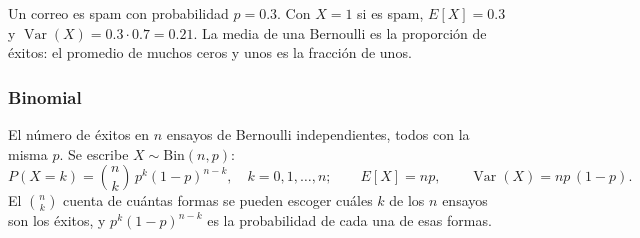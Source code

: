 \documentclass[11pt,letterpaper]{article}
\begin{document}
\begin{ejemplo}[¿Es spam?]
    Un correo es spam con probabilidad $p = 0.3$. Con $X = 1$ si es
    spam, $E[X] = 0.3$ y $\operatorname{Var}(X) = 0.3 \cdot 0.7 =
    0.21$. La media de una Bernoulli es la proporción de éxitos: el
    promedio de muchos ceros y unos es la fracción de unos.
    \begin{center}
    \end{center}
\end{ejemplo}

\subsubsection*{Binomial}

El número de éxitos en $n$ ensayos de Bernoulli independientes, todos
con la misma $p$. Se escribe $X \sim \text{Bin}(n, p)$:
\[
    P(X = k) = \binom{n}{k}\, p^{k} (1 - p)^{n - k} ,
    \quad k = 0, 1, \ldots, n ;
    \qquad E[X] = np , \qquad \operatorname{Var}(X) = np\,(1 - p) .
\]
El $\binom{n}{k}$ cuenta de cuántas formas se pueden escoger cuáles
$k$ de los $n$ ensayos son los éxitos, y $p^k (1-p)^{n-k}$ es la
probabilidad de cada una de esas formas.
\end{document}
